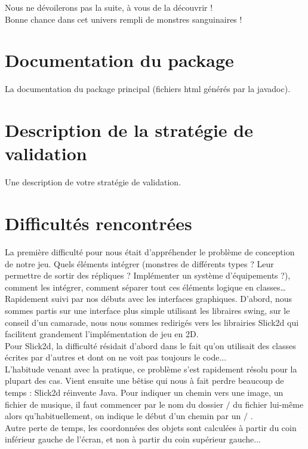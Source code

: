 \documentclass[a4paper,titlepage]{article}
\begin{document}
	Nous ne dévoilerons pas la suite, à vous de la découvrir !\\
	
	Bonne chance dans cet univers rempli de monstres sanguinaires !
	\clearpage
	
	\section{Documentation du package}
	La documentation du package principal (fichiers html générés par la javadoc).
	\clearpage
	
	\section{Description de la stratégie de validation}
	Une description de votre stratégie de validation.
	\clearpage
	
	\section{Difficultés rencontrées}
	La première difficulté pour nous était d’appréhender le problème de conception de notre jeu. Quels éléments intégrer (monstres de différents types ? Leur permettre de sortir des répliques ? Implémenter un système d’équipements ?), comment les intégrer, comment séparer tout ces éléments logique en classes…\\
	
Rapidement suivi par nos débuts avec les interfaces graphiques. D’abord, nous sommes partis sur une interface plus simple utilisant les libraires swing, sur le conseil d’un camarade, nous nous sommes redirigés vers les librairies Slick2d qui facilitent grandement l’implémentation de jeu en 2D.\\

Pour Slick2d, la difficulté résidait d’abord dans le fait qu’on utilisait des classes écrites par d’autres et dont on ne voit pas toujours le code...\\ L’habitude venant avec la pratique, ce problème s’est rapidement résolu pour la plupart des cas. Vient ensuite une bêtise qui nous à fait perdre beaucoup de temps : Slick2d \og réinvente \fg{} Java. Pour indiquer un chemin vers une image, un fichier de musique, il faut commencer par le nom du dossier $/$ du fichier lui-même alors qu'habituellement, on indique le début d’un chemin par un \og $/$ \fg{}. \\

Autre perte de temps, les coordonnées des objets sont calculées à partir du coin inférieur gauche de l’écran, et non à partir du coin supérieur gauche...\\
\end{document}
